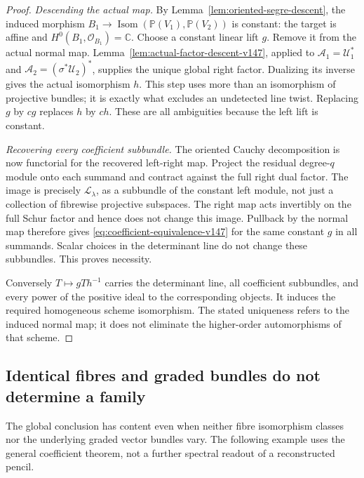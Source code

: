 \documentclass[11pt,reqno]{amsart}
\numberwithin{equation}{section}
\theoremstyle{definition}\newtheorem{definition}[theorem]{Definition}
\theoremstyle{remark}\newtheorem{remark}[theorem]{Remark}
\newcommand{\C}{\mathbb C}\newcommand{\Q}{\mathbb Q}
\newcommand{\Pj}{\mathbb P}\newcommand{\A}{\mathbb A}
\newcommand{\OO}{\mathcal O}\newcommand{\II}{\mathcal I}
\begin{document}
\begin{proof}
\emph{Descending the actual map.}
By Lemma~\ref{lem:oriented-segre-descent}, the induced morphism
\(B_1\to\operatorname{Isom}(\Pj(V_1),\Pj(V_2))\) is constant:
the target is affine and \(H^0(B_1,\OO_{B_1})=\C\).  Choose a
constant linear lift \(g\).  Remove it from the actual normal map.
Lemma~\ref{lem:actual-factor-descent-v147}, applied to
\(\mathcal A_1=\mathcal U_1^*\) and
\(\mathcal A_2=(\sigma^*\mathcal U_2)^*\), supplies the unique
global right factor.  Dualizing its inverse gives the actual
isomorphism \(h\).  This step uses more than an isomorphism of
projective bundles; it is exactly what excludes an undetected line
twist.  Replacing \(g\) by \(cg\) replaces \(h\) by \(ch\).
These are all ambiguities because the left lift is constant.

\emph{Recovering every coefficient subbundle.}
The oriented Cauchy decomposition is now functorial for the recovered
left-right map.  Project the residual degree-\(q\) module onto each
summand and contract against the full right dual factor.  The image
is precisely \(\mathcal L_\lambda\), as a subbundle of the
constant left module, not just a collection of fibrewise projective
subspaces.  The right map acts invertibly on the full Schur factor
and hence does not change this image.  Pullback by the normal map
therefore gives \eqref{eq:coefficient-equivalence-v147} for the same
constant \(g\) in all summands.  Scalar choices in the determinant
line do not change these subbundles.  This proves necessity.

Conversely \(T\mapsto gTh^{-1}\) carries the determinant line,
all coefficient subbundles, and every power of the positive ideal
to the corresponding objects.  It induces the required homogeneous
scheme isomorphism.  The stated uniqueness refers to the induced
normal map; it does not eliminate the higher-order automorphisms of
that scheme.
\end{proof}

\subsection{Identical fibres and graded bundles do not determine a family}
The global conclusion has content even when neither fibre isomorphism
classes nor the underlying graded vector bundles vary.  The following
example uses the general coefficient theorem, not a further spectral
readout of a reconstructed pencil.
\end{document}
